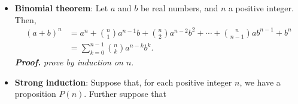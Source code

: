 \documentclass{report}
\begin{document}
\begin{itemize}
\begin{align*}
                1^{2} + 2^{2} + \cdots + n^{2} = \frac{n(n+1)(2n+1)}{6}
            .\end{align*}
            First,  we observe that
            \begin{align*}
                1^{2} = \frac{1(1+1)(2(1) + 1)}{6} = 1
            .\end{align*}
            So, $P(1)$ is true. Next, assume that $P(n)$ is true, where
            \begin{align*}
                P(n) = 1^{2} + 2^{2} + \cdots + n^{2} = \frac{n(n+1)(2n+1)}{6}
            .\end{align*}
            Now, observe that
            \begin{align*}
                P(n+1) &= 1^{2} + 2^{2} + \cdots + n^{2} + (n+1)^{2} = P(n) + (n+1)^{2} \\
                &= \frac{n(n+1)(2n+1)}{6} + (n+1)^{2} = \frac{n(2n+1)}{6} + (n+1) \\
                &= \frac{n(2n+1) +6(n+1)}{6} = \frac{2n^{2} + n  + 6n + 6}{6} = \frac{2n^{2} + 7n + 6}{6}
            .\end{align*}
            From here, we can get that
            \begin{align*}
                \frac{2n^{2} + 7n + 6}{6} = \frac{(n+2)(2n+3)}{6}
            .\end{align*}
            So,
            \begin{align*}
                \frac{P(n)}{n+1} + (n+1) = \frac{(n+2)(2n+3)}{6} 
            .\end{align*}
            Thus,
            \begin{align*}
                P(n) + (n+1)^{2} = P(n+1) = \frac{(n+1)((n+1)+1)(2(n+1)  +1)}{6}
            \end{align*}
            Thus, $P(n)$ implies $P(n+1)$, and $P$ therefore holds for every positive integer $n$.
        \item \textbf{Binomial theorem}: Let $a$ and $b$ be real numbers, and $n$ a positive integer. Then,
            \begin{align*}
                (a+b)^{n} &= a^{n} + \binom{n}{1}a^{n-1}b + \binom{n}{2}a^{n-2}b^{2} + \cdots + \binom{n}{n-1}ab^{n-1} + b^{n} \\
                          &= \sum_{k=0}^{n-1}\binom{n}{k}a^{n-k}b^{k}
            .\end{align*}
            \textbf{\textit{Proof.}} \textit{prove by induction on $n$}.
        \item \textbf{Strong induction}: Suppose that, for each positive integer $n$, we have a proposition $P(n)$. Further suppose that

\end{itemize}
\end{document}
